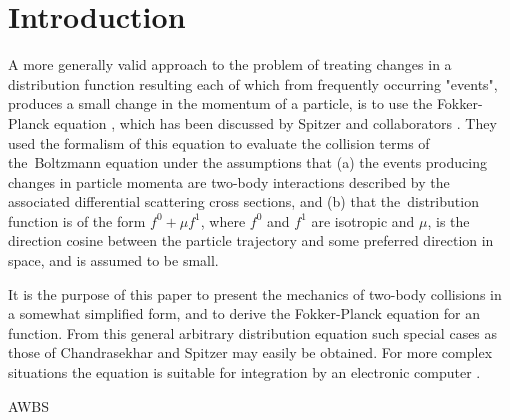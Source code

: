 \section{Introduction}
\label{sec:Intro}

A more generally valid approach to the problem of
treating changes in a distribution function resulting
each of which from frequently occurring "events",
produces a small change in the momentum of a particle,
is to use the Fokker-Planck equation \cite{Planck_1917}, 
which has been discussed by Spitzer and collaborators 
\cite{CSR_1950, SpitzerHarm_PR1953} . They used the formalism 
of this equation to evaluate the collision terms of the~Boltzmann equation 
under the assumptions that 
(a) the events producing changes in particle momenta
are two-body interactions described by the associated
differential scattering cross sections, and 
(b) that the~distribution 
function is of the form $f^0+\mu f^1$, where $f^0$ and $f^1$ are isotropic
and $\mu$, is the direction cosine between the particle trajectory 
and some preferred direction in space, and is assumed to be small.

It is the purpose of this paper to present the mechanics 
of two-body collisions in a somewhat simplified
form, and to derive the Fokker-Planck equation for an function. 
From this general arbitrary distribution equation such special cases 
as those of Chandrasekhar and Spitzer may easily be obtained. 
For more complex situations the equation is suitable for integration by an
electronic computer \cite{Rosenbluth_PR1957}.

AWBS \cite{AWBS_PRL1986} 
